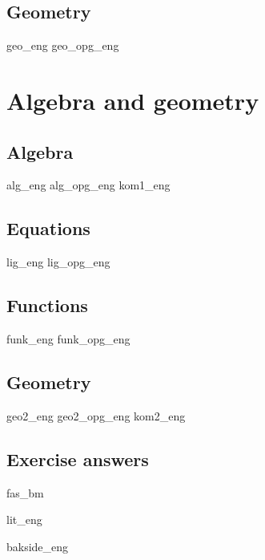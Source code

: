 \chapter{Geometry}
\newpage
{geo_eng}
{geo_opg_eng}

\part{Algebra and geometry \label{Del2}}
\chapter{Algebra}
\newpage
{alg_eng}
{alg_opg_eng}
\newpage
{kom1_eng}

\chapter{Equations \label{Likningar}}
\newpage
{lig_eng}
{lig_opg_eng}

\chapter{Functions \label{Funksjoner}}
{funk_eng}
{funk_opg_eng}

\chapter{Geometry}
\newpage
{geo2_eng}
{geo2_opg_eng}
\newpage
{kom2_eng}

\newpage
{}
{}
\chapter*{Exercise answers}
{fas_bm}

{lit_eng}
{\printindex {}
	}
{bakside_eng}













